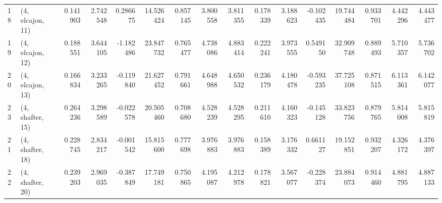 \begin{tabular}{llrrrrrrrrrrrrrr}
18 &  (4, elcajon, 11) &   0.141903 &  2.742548 &  0.286675 &  14.526424 &  0.857145 &   3.800558 &  3.811355 &  0.178339 &  3.188623 & -0.102435 &   19.744484 &  0.933701 &   4.442296 &   4.443477 \\
19 &  (4, elcajon, 12) &   0.188551 &  3.644105 & -1.182486 &  23.847732 &  0.765477 &   4.738086 &  4.883414 &  0.222241 &  3.973555 &  0.549150 &   32.909748 &  0.889493 &   5.710357 &   5.736702 \\
20 &  (4, elcajon, 13) &   0.166834 &  3.233265 & -0.119840 &  21.627452 &  0.791661 &   4.648988 &  4.650532 &  0.236179 &  4.180478 & -0.593235 &   37.725108 &  0.871515 &   6.113361 &   6.142077 \\
23 &  (4, shafter, 15) &   0.264236 &  3.298589 & -0.022578 &  20.505460 &  0.708680 &   4.528239 &  4.528295 &  0.211610 &  4.160323 & -0.145128 &   33.823756 &  0.879765 &   5.814008 &   5.815819 \\
21 &  (4, shafter, 18) &   0.228745 &  2.834217 & -0.001542 &  15.815600 &  0.777698 &   3.976883 &  3.976883 &  0.158389 &  3.176332 &  0.661127 &   19.152851 &  0.932207 &   4.326172 &   4.376397 \\
22 &  (4, shafter, 20) &   0.239203 &  2.969035 & -0.387849 &  17.749181 &  0.750865 &   4.195087 &  4.212978 &  0.178821 &  3.567077 & -0.228374 &   23.884073 &  0.914460 &   4.881795 &   4.887133 \\
\bottomrule
\end{tabular}
